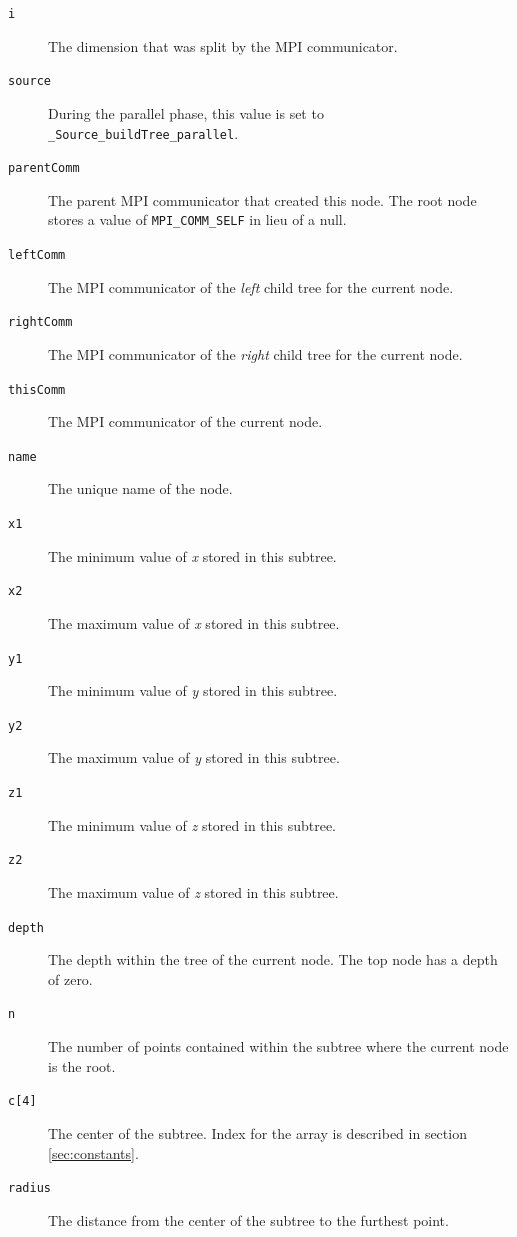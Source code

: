 \documentclass{article}
\begin{document}
\begin{description}
    \item[\texttt{i}]{The dimension that was split by the MPI communicator.}
    \item[\texttt{source}]{During the parallel phase, this value is set to \texttt{\_Source\_buildTree\_parallel}.}
    \item[\texttt{parentComm}]{The parent MPI communicator that created this node. The root node stores a value of \texttt{MPI\_COMM\_SELF} in lieu of a null.}
    \item[\texttt{leftComm}]{The MPI communicator of the \textit{left} child tree for the current node.}
    \item[\texttt{rightComm}]{The MPI communicator of the \textit{right} child tree for the current node.}
    \item[\texttt{thisComm}]{The MPI communicator of the current node.}
    \item[\texttt{name}]{The unique name of the node.}
    \item[\texttt{x1}]{The minimum value of \textit{x} stored in this subtree.}
    \item[\texttt{x2}]{The maximum value of \textit{x} stored in this subtree.}
    \item[\texttt{y1}]{The minimum value of \textit{y} stored in this subtree.}
    \item[\texttt{y2}]{The maximum value of \textit{y} stored in this subtree.}
    \item[\texttt{z1}]{The minimum value of \textit{z} stored in this subtree.}
    \item[\texttt{z2}]{The maximum value of \textit{z} stored in this subtree.}
    \item[\texttt{depth}]{The depth within the tree of the current node. The top node has a depth of zero.}
    \item[\texttt{n}]{The number of points contained within the subtree where the current node is the root.}
    \item[\texttt{c[4]}]{The center of the subtree. Index for the array is described in section \ref{sec:constants}.}
    \item[\texttt{radius}]{The distance from the center of the subtree to the furthest point.}
\end{description}
\end{document}

